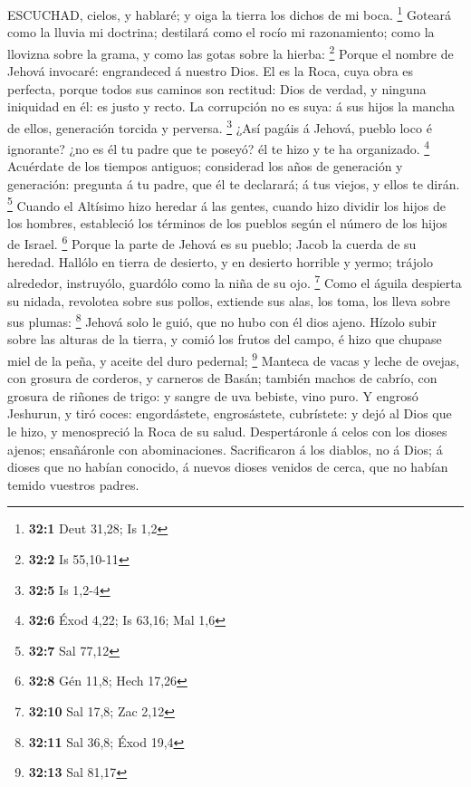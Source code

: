  ESCUCHAD, cielos, y hablaré; y oiga la tierra los dichos de
mi boca. \footnote{\textbf{32:1} Deut 31,28; Is 1,2} 
Goteará como la lluvia mi doctrina; destilará como el rocío mi
razonamiento; como la llovizna sobre la grama, y como las gotas sobre la
hierba: \footnote{\textbf{32:2} Is 55,10-11}  Porque el
nombre de Jehová invocaré: engrandeced á nuestro Dios.  El
es la Roca, cuya obra es perfecta, porque todos sus caminos son
rectitud: Dios de verdad, y ninguna iniquidad en él: es justo y recto.
 La corrupción no es suya: á sus hijos la mancha de ellos,
generación torcida y perversa. \footnote{\textbf{32:5} Is 1,2-4}
 ¿Así pagáis á Jehová, pueblo loco é ignorante? ¿no es él tu
padre que te poseyó? él te hizo y te ha organizado. \footnote{\textbf{32:6}
  Éxod 4,22; Is 63,16; Mal 1,6}  Acuérdate de los tiempos
antiguos; considerad los años de generación y generación: pregunta á tu
padre, que él te declarará; á tus viejos, y ellos te dirán. \footnote{\textbf{32:7}
  Sal 77,12}  Cuando el Altísimo hizo heredar á las gentes,
cuando hizo dividir los hijos de los hombres, estableció los términos de
los pueblos según el número de los hijos de Israel. \footnote{\textbf{32:8}
  Gén 11,8; Hech 17,26}  Porque la parte de Jehová es su
pueblo; Jacob la cuerda de su heredad.  Hallólo en tierra
de desierto, y en desierto horrible y yermo; trájolo alrededor,
instruyólo, guardólo como la niña de su ojo. \footnote{\textbf{32:10}
  Sal 17,8; Zac 2,12}  Como el águila despierta su nidada,
revolotea sobre sus pollos, extiende sus alas, los toma, los lleva sobre
sus plumas: \footnote{\textbf{32:11} Sal 36,8; Éxod 19,4} 
Jehová solo le guió, que no hubo con él dios ajeno.  Hízolo
subir sobre las alturas de la tierra, y comió los frutos del campo, é
hizo que chupase miel de la peña, y aceite del duro pedernal;
\footnote{\textbf{32:13} Sal 81,17}  Manteca de vacas y
leche de ovejas, con grosura de corderos, y carneros de Basán; también
machos de cabrío, con grosura de riñones de trigo: y sangre de uva
bebiste, vino puro.  Y engrosó Jeshurun, y tiró coces:
engordástete, engrosástete, cubrístete: y dejó al Dios que le hizo, y
menospreció la Roca de su salud.  Despertáronle á celos con
los dioses ajenos; ensañáronle con abominaciones. 
Sacrificaron á los diablos, no á Dios; á dioses que no habían conocido,
á nuevos dioses venidos de cerca, que no habían temido vuestros padres.
